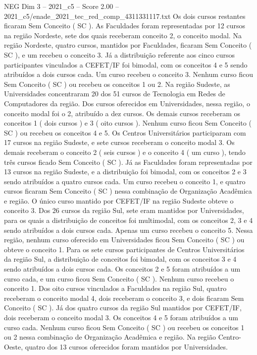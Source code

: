 \begin{textsample}{NEG Dim 3 – 2021\_c5 – Score 2.00 – 2021\_c5/enade\_2021\_tec\_red\_comp\_4311331117.txt}
Os dois cursos restantes ficaram Sem Conceito ( SC ).
As Faculdades foram representadas por 12 cursos na região Nordeste, sete dos quais receberam conceito 2, o conceito modal.
Na região Nordeste, quatro cursos, mantidos por Faculdades, ficaram Sem Conceito ( SC ), e um recebeu o conceito 3.
Já a distribuição referente aos cinco cursos participantes vinculados a CEFET/IF foi bimodal, com os conceitos 4 e 5 sendo atribuídos a dois cursos cada.
Um curso recebeu o conceito 3.
Nenhum curso ficou Sem Conceito ( SC ) ou recebeu os conceitos 1 ou 2.
Na região Sudeste, as Universidades concentraram 20 dos 51 cursos de Tecnologia em Redes de Computadores da região.
Dos cursos oferecidos em Universidades, nessa região, o conceito modal foi o 2, atribuído a dez cursos.
Os demais cursos receberam os conceitos 1 ( dois cursos ) e 3 ( oito cursos ).
Nenhum curso ficou Sem Conceito ( SC ) ou recebeu os conceitos 4 e 5.
Os Centros Universitários participaram com 17 cursos na região Sudeste, e sete cursos receberam o conceito modal 3.
Os demais receberam o conceito 2 ( seis cursos ) e o conceito 4 ( um curso ), tendo três cursos ficado Sem Conceito ( SC ).
Já as Faculdades foram representadas por 13 cursos na região Sudeste, e a distribuição foi bimodal, com os conceitos 2 e 3 sendo atribuídos a quatro cursos cada.
Um curso recebeu o conceito 1, e quatro cursos ficaram Sem Conceito ( SC ) nessa combinação de Organização Acadêmica e região.
O único curso mantido por CEFET/IF na região Sudeste obteve o conceito 3.
Dos 26 cursos da região Sul, sete eram mantidos por Universidades, para os quais a distribuição de conceitos foi multimodal, com os conceitos 2, 3 e 4 sendo atribuídos a dois cursos cada.
Apenas um curso recebeu o conceito 5.
Nessa região, nenhum curso oferecido em Universidades ficou Sem Conceito ( SC ) ou obteve o conceito 1.
Para os sete cursos participantes de Centros Universitários da região Sul, a distribuição de conceitos foi bimodal, com os conceitos 3 e 4 sendo atribuídos a dois cursos cada.
Os conceitos 2 e 5 foram atribuídos a um curso cada, e um curso ficou Sem Conceito ( SC ).
Nenhum curso recebeu o conceito 1.
Dos oito cursos vinculados a Faculdades na região Sul, quatro receberam o conceito modal 4, dois receberam o conceito 3, e dois ficaram Sem Conceito ( SC ).
Já dos quatro cursos da região Sul mantidos por CEFET/IF, dois receberam o conceito modal 3.
Os conceitos 4 e 5 foram atribuídos a um curso cada.
Nenhum curso ficou Sem Conceito ( SC ) ou recebeu os conceitos 1 ou 2 nessa combinação de Organização Acadêmica e região.
Na região Centro-Oeste, quatro dos 13 cursos oferecidos foram mantidos por Universidades.

\end{textsample}
